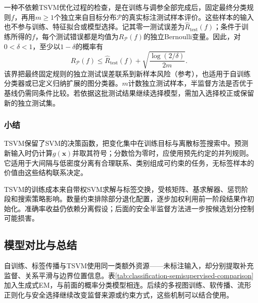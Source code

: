 一种不依赖TSVM优化过程的检查，是在训练与调参全部完成后，固定最终分类规则$f$，再用$m\geq1$个独立来自目标分布$\mathcal{P}$的真实标注测试样本评价。这些样本的输入也不参与训练、特征拟合或模型选择。记其零一测试误差为$\widehat R_{\mathrm{test}}(f)$；条件于训练所得的$f$，每个测试错误都是均值为$R_{\mathcal{P}}(f)$的独立Bernoulli变量。因此，对$0<\delta<1$，至少以$1-\delta$的概率有
\begin{equation}
  \label{eq:classification-semisupervised-test-risk}
  R_{\mathcal{P}}(f)
    \leq\widehat R_{\mathrm{test}}(f)
       +\sqrt{\frac{\log(2/\delta)}{2m}}.
\end{equation}
该界把最终固定规则的独立测试误差联系到新样本风险（参考），也适用于自训练分类器或已定义归纳扩展的图分类器。$m$计数独立测试样本，半监督方法是否优于基线仍需同条件比较。若依据这批测试结果继续选择模型，需加入选择校正或保留新的独立测试集。

\subsubsection{小结}
\label{sec:classification-tsvm-summary}

TSVM保留了SVM的决策函数，把变化集中在训练目标与离散标签搜索中。预测新输入时仍计算$g(\bm{x})$并取其符号；分数恰为零时，应使用预先约定的并列规则。它适用于大间隔与低密度分离有合理联系、类别组成可约束的任务，无标签样本的价值由这些结构联系决定。

TSVM的训练成本来自带权SVM求解与标签交换，受核矩阵、基求解器、惩罚阶段和搜索策略影响。数量约束排除部分退化配置，逐步加权利用前一阶段结果作初始化。准确率收益仍依赖分离假设；后面的安全半监督方法进一步按候选划分控制可能损害。

\subsection{模型对比与总结}
\label{sec:classification-semisupervised-comparison}

自训练、标签传播与TSVM使用同一类额外资源——未标注输入，却分别提取补充监督、关系平滑与边界位置信息。表\ref{tab:classification-semisupervised-comparison}加入生成式EM，与前面的概率分类模型相连。后续的多视图训练、软传播、流形正则化与安全选择继续改变监督来源或约束方式，这些机制可以结合使用。

